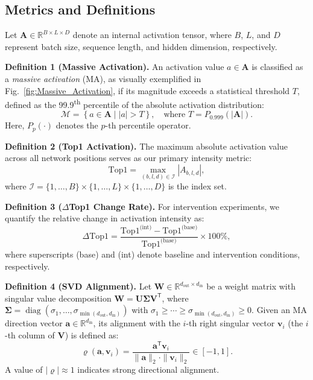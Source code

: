 \documentclass[conference]{IEEEtran}
\begin{document}
\subsection{Metrics and Definitions}

Let $\mathbf{A} \in \mathbb{R}^{B \times L \times D}$ denote an internal activation tensor, where $B$, $L$, and $D$ represent batch size, sequence length, and hidden dimension, respectively.

\vspace{0.5em}
\noindent\textbf{Definition 1 (Massive Activation).} An activation value $a \in \mathbf{A}$ is classified as a \textit{massive activation} (MA), as visually exemplified in Fig.~\ref{fig:Massive_Activation}, if its magnitude exceeds a statistical threshold $T$, defined as the 99.9\textsuperscript{th} percentile of the absolute activation distribution:
\begin{equation}
\mathcal{M} = \left\{ a \in \mathbf{A} \mid |a| > T \right\}, \quad \text{where } T = P_{0.999}\left(|\mathbf{A}|\right).
\end{equation}
Here, $P_{p}(\cdot)$ denotes the $p$-th percentile operator.

\vspace{0.5em}
\noindent\textbf{Definition 2 (Top1 Activation).} The maximum absolute activation value across all network positions serves as our primary intensity metric:
\begin{equation}
\text{Top1} = \max_{(b,l,d) \in \mathcal{I}} |A_{b,l,d}|,
\end{equation}
where $\mathcal{I} = \{1,\dots,B\} \times \{1,\dots,L\} \times \{1,\dots,D\}$ is the index set.

\vspace{0.5em}
\noindent\textbf{Definition 3 ($\Delta$Top1 Change Rate).} For intervention experiments, we quantify the relative change in activation intensity as:
\begin{equation}
\Delta\text{Top1} = \frac{\text{Top1}^{\text{(int)}} - \text{Top1}^{\text{(base)}}}{\text{Top1}^{\text{(base)}}} \times 100\%,
\end{equation}
where superscripts (base) and (int) denote baseline and intervention conditions, respectively.

\vspace{0.5em}
\noindent\textbf{Definition 4 (SVD Alignment).} Let $\mathbf{W} \in \mathbb{R}^{d_{\text{out}} \times d_{\text{in}}}$ be a weight matrix with singular value decomposition $\mathbf{W} = \mathbf{U}\boldsymbol{\Sigma}\mathbf{V}^{\mathsf{T}}$, where $\boldsymbol{\Sigma} = \operatorname{diag}(\sigma_1, \dots, \sigma_{\min(d_{\text{out}},d_{\text{in}})})$ with $\sigma_1 \geq \cdots \geq \sigma_{\min(d_{\text{out}},d_{\text{in}})} \geq 0$. Given an MA direction vector $\mathbf{a} \in \mathbb{R}^{d_{\text{in}}}$, its alignment with the $i$-th right singular vector $\mathbf{v}_i$ (the $i$-th column of $\mathbf{V}$) is defined as:
\begin{equation}
\varrho(\mathbf{a}, \mathbf{v}_i) = \frac{\mathbf{a}^{\mathsf{T}}\mathbf{v}_i}{\|\mathbf{a}\|_2 \cdot \|\mathbf{v}_i\|_2} \in [-1, 1].
\end{equation}
A value of $|\varrho| \approx 1$ indicates strong directional alignment.
\end{document}
